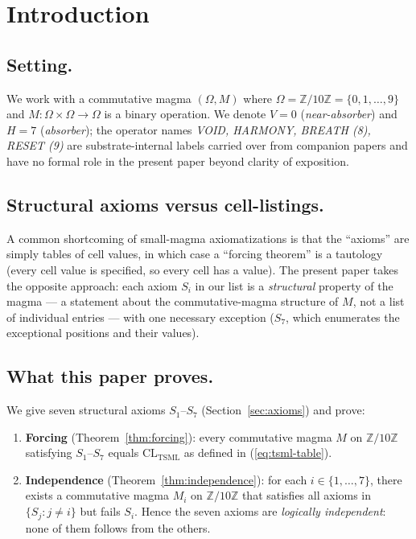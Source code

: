\documentclass[11pt,reqno]{amsart}
\theoremstyle{plain}
\theoremstyle{definition}
\theoremstyle{remark}
\newcommand{\Z}{\mathbb{Z}}
\newcommand{\TSML}{\mathrm{TSML}}
\newcommand{\CL}{\mathrm{CL}}
\begin{document}
\maketitle

\tableofcontents

\section{Introduction}
\label{sec:intro}

\subsection{Setting.}
We work with a commutative magma $(\Omega, M)$ where
$\Omega = \Z/10\Z = \{0, 1, \ldots, 9\}$ and
$M : \Omega \times \Omega \to \Omega$ is a binary operation. We
denote $V = 0$ (\emph{near-absorber}) and $H = 7$ (\emph{absorber});
the operator names \emph{VOID, HARMONY, BREATH (8), RESET (9)} are
substrate-internal labels carried over from companion papers
\cite{SandersGishFourCore} and have no formal role in the present
paper beyond clarity of exposition.

\subsection{Structural axioms versus cell-listings.}
A common shortcoming of small-magma axiomatizations is that the
``axioms'' are simply tables of cell values, in which case a
``forcing theorem'' is a tautology (every cell value is specified, so
every cell has a value). The present paper takes the opposite
approach: each axiom $S_{i}$ in our list is a \emph{structural}
property of the magma --- a statement about the commutative-magma
structure of $M$, not a list of individual entries --- with one
necessary exception ($S_{7}$, which enumerates the exceptional
positions and their values).

\subsection{What this paper proves.}
We give seven structural axioms $S_{1}$--$S_{7}$
(Section~\ref{sec:axioms}) and prove:

\begin{enumerate}
\item \textbf{Forcing} (Theorem~\ref{thm:forcing}): every commutative
magma $M$ on $\Z/10\Z$ satisfying $S_{1}$--$S_{7}$ equals
$\CL_{\TSML}$ as defined in (\ref{eq:tsml-table}).

\item \textbf{Independence} (Theorem~\ref{thm:independence}): for
each $i \in \{1, \ldots, 7\}$, there exists a commutative magma
$M_{i}$ on $\Z/10\Z$ that satisfies all axioms in $\{S_{j} :
j \neq i\}$ but fails $S_{i}$. Hence the seven axioms are
\emph{logically independent}: none of them follows from the others.
\end{enumerate}
\end{document}

